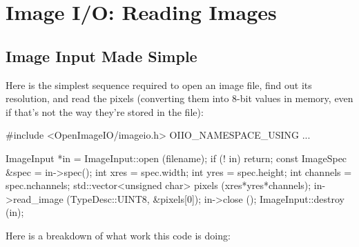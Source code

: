 \chapter{Image I/O: Reading Images}
\label{chap:imageinput}


\section{Image Input Made Simple}
\label{sec:imageinput:simple}

Here is the simplest sequence required to open an image file, find
out its resolution, and read the pixels (converting them into
8-bit values in memory, even if that's not the way they're stored in the file):

\begin{code}
        #include <OpenImageIO/imageio.h>
        OIIO_NAMESPACE_USING
        ...

        ImageInput *in = ImageInput::open (filename);
        if (! in)
            return;
        const ImageSpec &spec = in->spec();
        int xres = spec.width;
        int yres = spec.height;
        int channels = spec.nchannels;
        std::vector<unsigned char> pixels (xres*yres*channels);
        in->read_image (TypeDesc::UINT8, &pixels[0]);
        in->close ();
        ImageInput::destroy (in);
\end{code}

\noindent Here is a breakdown of what work this code is doing:

